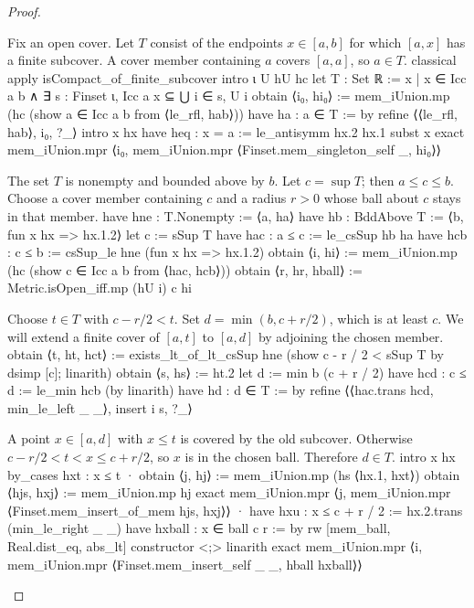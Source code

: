 \begin{proof}
  \begin{lean}{Fix an open cover. Let $T$ consist of the endpoints $x\in[a,b]$ for which $[a,x]$ has a finite subcover. A cover member containing $a$ covers $[a,a]$, so $a\in T$.}
    classical
    apply isCompact_of_finite_subcover
    intro ι U hU hc
    let T : Set ℝ := {x | x ∈ Icc a b ∧ ∃ s : Finset ι, Icc a x ⊆ ⋃ i ∈ s, U i}
    obtain ⟨i₀, hi₀⟩ := mem_iUnion.mp (hc (show a ∈ Icc a b from ⟨le_rfl, hab⟩))
    have ha : a ∈ T := by
      refine ⟨⟨le_rfl, hab⟩, {i₀}, ?_⟩
      intro x hx
      have heq : x = a := le_antisymm hx.2 hx.1
      subst x
      exact mem_iUnion.mpr ⟨i₀, mem_iUnion.mpr ⟨Finset.mem_singleton_self _, hi₀⟩⟩
  \end{lean}

  \begin{lean}{The set $T$ is nonempty and bounded above by $b$. Let $c=\sup T$; then $a\leq c\leq b$. Choose a cover member containing $c$ and a radius $r>0$ whose ball about $c$ stays in that member.}
    have hne : T.Nonempty := ⟨a, ha⟩
    have hb : BddAbove T := ⟨b, fun x hx => hx.1.2⟩
    let c := sSup T
    have hac : a ≤ c := le_csSup hb ha
    have hcb : c ≤ b := csSup_le hne (fun x hx => hx.1.2)
    obtain ⟨i, hi⟩ := mem_iUnion.mp (hc (show c ∈ Icc a b from ⟨hac, hcb⟩))
    obtain ⟨r, hr, hball⟩ := Metric.isOpen_iff.mp (hU i) c hi
  \end{lean}

  \begin{lean}{Choose $t\in T$ with $c-r/2<t$. Set $d=\min(b,c+r/2)$, which is at least $c$. We will extend a finite cover of $[a,t]$ to $[a,d]$ by adjoining the chosen member.}
    obtain ⟨t, ht, hct⟩ := exists_lt_of_lt_csSup hne (show c - r / 2 < sSup T by dsimp [c]; linarith)
    obtain ⟨s, hs⟩ := ht.2
    let d := min b (c + r / 2)
    have hcd : c ≤ d := le_min hcb (by linarith)
    have hd : d ∈ T := by
      refine ⟨⟨hac.trans hcd, min_le_left _ _⟩, insert i s, ?_⟩
  \end{lean}

  \begin{lean}{A point $x\in[a,d]$ with $x\leq t$ is covered by the old subcover. Otherwise $c-r/2<t<x\leq c+r/2$, so $x$ is in the chosen ball. Therefore $d\in T$.}
    intro x hx
    by_cases hxt : x ≤ t
    · obtain ⟨j, hj⟩ := mem_iUnion.mp (hs ⟨hx.1, hxt⟩)
      obtain ⟨hjs, hxj⟩ := mem_iUnion.mp hj
      exact mem_iUnion.mpr ⟨j, mem_iUnion.mpr ⟨Finset.mem_insert_of_mem hjs, hxj⟩⟩
    · have hxu : x ≤ c + r / 2 := hx.2.trans (min_le_right _ _)
      have hxball : x ∈ ball c r := by
        rw [mem_ball, Real.dist_eq, abs_lt]
        constructor <;> linarith
      exact mem_iUnion.mpr ⟨i, mem_iUnion.mpr ⟨Finset.mem_insert_self _ _, hball hxball⟩⟩
  \end{lean}


\end{proof}
